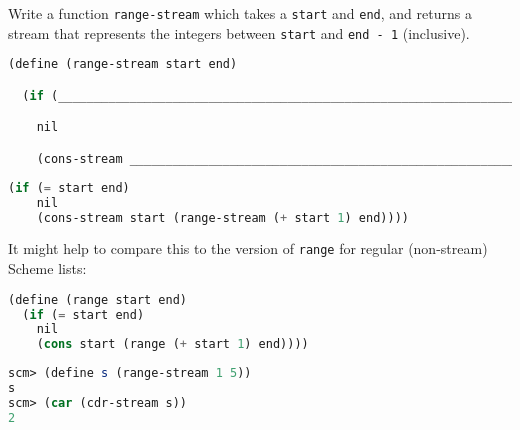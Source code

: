 \question Write a function \texttt{range-stream} which takes a \texttt{start}
and \texttt{end}, and returns a stream that represents the integers between
\texttt{start} and \texttt{end - 1} (inclusive).

\begin{lstlisting}[language=Scheme]
(define (range-stream start end)

  (if (___________________________________________________________________________________)

    nil

    (cons-stream _________________________________________________________________________)))
\end{lstlisting}
\begin{solution}
\begin{lstlisting}[language=Scheme]
  (if (= start end)
    nil
    (cons-stream start (range-stream (+ start 1) end))))
\end{lstlisting}

It might help to compare this to the version of \texttt{range} for regular
(non-stream) Scheme lists:
\begin{lstlisting}[language=Scheme]
(define (range start end)
  (if (= start end)
    nil
    (cons start (range (+ start 1) end))))
\end{lstlisting}

\end{solution}

\begin{lstlisting}[language=Scheme]
scm> (define s (range-stream 1 5))
s
scm> (car (cdr-stream s))
2
\end{lstlisting}
